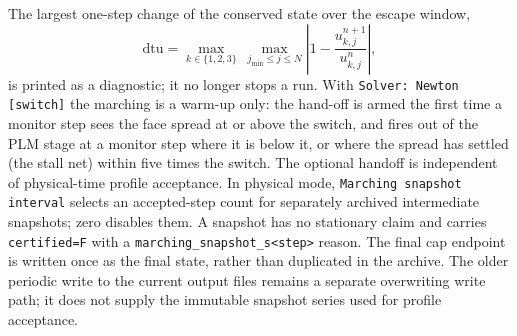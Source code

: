 The largest one-step change of the conserved state over the escape window,
%
\begin{equation}
  \mathrm{dtu} = \max_{k\in\{1,2,3\}}\ \max_{j_{\min}\le j\le N}
                 \left|1 - \frac{u^{n+1}_{k,j}}{u^{n}_{k,j}}\right|,
  \label{eq:dtu}
\end{equation}
%
is printed as a diagnostic; it no longer stops a run.  With \texttt{Solver:
Newton [switch]} the marching is a warm-up only: the hand-off is armed the
first time a monitor step sees the face spread at or above the switch, and
fires out of the PLM stage at a monitor step where it is below it, or where
the spread has settled (the stall net) within five times the switch.
The optional handoff is independent of physical-time profile acceptance.
In physical mode, \texttt{Marching snapshot interval} selects an accepted-step
count for separately archived intermediate snapshots; zero disables them. A snapshot has no
stationary claim and carries \texttt{certified=F} with a
\texttt{marching\_snapshot\_s<step>} reason. The final cap endpoint is
written once as the final state, rather than duplicated in the archive.
The older periodic write to the current output files remains a separate
overwriting write path; it does not supply the immutable snapshot series
used for profile acceptance.
